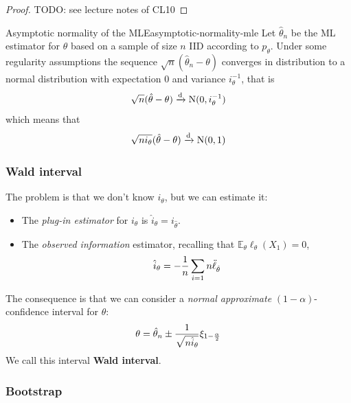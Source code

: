 \documentclass[12pt]{extarticle}
\newcommand{\E}{\mathds{E}}
\newcommand{\Normal}{{\operatorfont N}}
\newcommand{\convdist}{\xrightarrow{\operatorfont d}}
\begin{document}
\begin{proof}
    TODO: see lecture notes of CL10
\end{proof}

\begin{theorem}{Asymptotic normality of the MLE}{asymptotic-normality-mle}
    Let $\hat \theta_n$ be the ML estimator for $\theta$ based on a sample of size $n$ IID according to $p_\theta$.
    Under some regularity assumptions the sequence $\sqrt n (\hat \theta_n - \theta)$ converges in distribution to a normal distribution with expectation $0$ and variance $i_\theta^{-1}$, that is
    \begin{equation}
        \sqrt n (\hat \theta - \theta) \convdist \Normal(0, i_\theta^{-1})
    \end{equation}
    which means that
    \begin{equation}
        \sqrt{n i_\theta}(\hat \theta - \theta) \convdist \Normal(0, 1)
    \end{equation}
\end{theorem}

\subsubsection{Wald interval}

The problem is that we don't know $i_\theta$, but we can estimate it:
\begin{itemize}
    \item The \emph{plug-in estimator} for $i_\theta$ is $\hat i_\theta = i_{\hat \theta}$.
    \item The \emph{observed information} estimator, recalling that $\E_\theta \ell_\theta (X_1) = 0$,
          \begin{equation}
              \hat i_\theta = -\frac{1}{n} \sum_{i = 1}{n} \ddot \ell_{\hat \theta}
          \end{equation}
\end{itemize}

The consequence is that we can consider a \emph{normal approximate} $(1-\alpha)$-confidence interval for $\theta$:
\begin{equation}
    \theta = \hat \theta_n \pm \frac{1}{\sqrt{n \hat i_\theta}} \xi_{1- \frac{\alpha}{2}}
\end{equation}
We call this interval \textbf{Wald interval}.

\subsubsection{Bootstrap}
\end{document}
